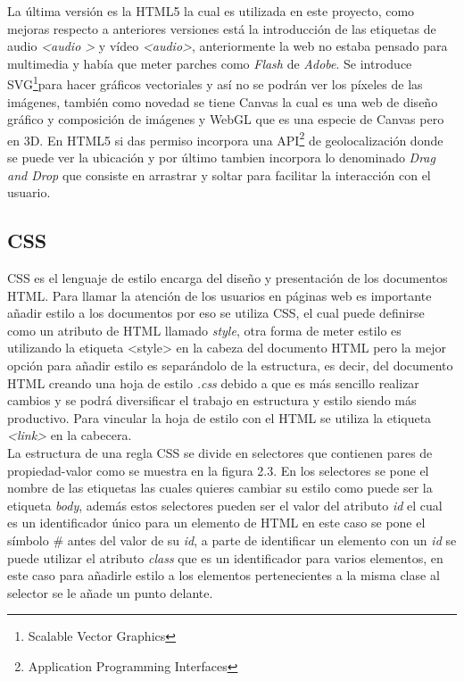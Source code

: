 La última versión es la HTML5 la cual es utilizada en este proyecto, como mejoras respecto a anteriores versiones está la introducción de las etiquetas de audio \textit{\textless audio \textgreater} y vídeo \textit{\textless audio\textgreater}, anteriormente la web no estaba pensado para multimedia y había que meter parches como\textit{ Flash} de \textit{Adobe}. Se introduce SVG\footnote{Scalable Vector Graphics }para hacer gráficos vectoriales y así no se podrán ver los píxeles de las imágenes, también como novedad se tiene Canvas la cual es una web de diseño gráfico y composición de imágenes y WebGL que es una especie de Canvas pero en 3D. En HTML5 si das permiso incorpora una API\footnote{Application Programming Interfaces} de geolocalización donde se puede ver la ubicación y por último tambien incorpora lo denominado \textit{Drag and Drop} que consiste en arrastrar y soltar para facilitar la interacción con el usuario.\\

\newpage
\subsection{CSS}
CSS es el lenguaje de estilo encarga del diseño y presentación de los documentos HTML. Para llamar la atención de los usuarios en páginas web es importante añadir estilo a los documentos por eso se utiliza CSS, el cual puede definirse como un atributo de HTML llamado\textit{ style}, otra forma de meter estilo es utilizando la etiqueta {\textless style\textgreater} en la cabeza del documento HTML pero la mejor opción para añadir estilo es separándolo de la estructura, es decir, del documento HTML creando una hoja de estilo \textit{.css}  debido a que es más sencillo realizar cambios y se podrá diversificar el trabajo en estructura y estilo siendo más productivo. Para vincular la hoja de estilo con el HTML se utiliza la etiqueta \textit{\textless link\textgreater} en la cabecera.\\

La estructura de una regla CSS se divide en selectores que contienen pares de propiedad-valor como se muestra en la figura 2.3. En los selectores se pone el nombre de las etiquetas las cuales quieres cambiar su estilo como puede ser la etiqueta \textit{body}, además estos selectores pueden ser el valor del atributo \textit{id} el cual es un identificador único para un elemento de HTML en este caso se pone el símbolo # antes del valor de su \textit{id}, a parte de identificar un elemento con un \textit{id} se puede utilizar el atributo \textit{class }que es un identificador para varios elementos, en este caso para añadirle estilo a los elementos pertenecientes a la misma clase al selector se le añade un punto delante.

